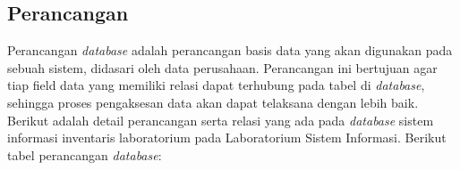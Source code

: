 \subsection{Perancangan }
Perancangan \textit{database} adalah perancangan basis data yang akan digunakan pada sebuah sistem, didasari oleh data perusahaan. Perancangan ini bertujuan agar tiap field data yang memiliki relasi dapat terhubung pada tabel di \textit{database}, sehingga proses pengaksesan data akan dapat telaksana dengan lebih baik. Berikut adalah detail perancangan serta relasi yang ada pada \textit{database} sistem informasi inventaris laboratorium pada Laboratorium Sistem Informasi. Berikut tabel perancangan \textit{database}:

